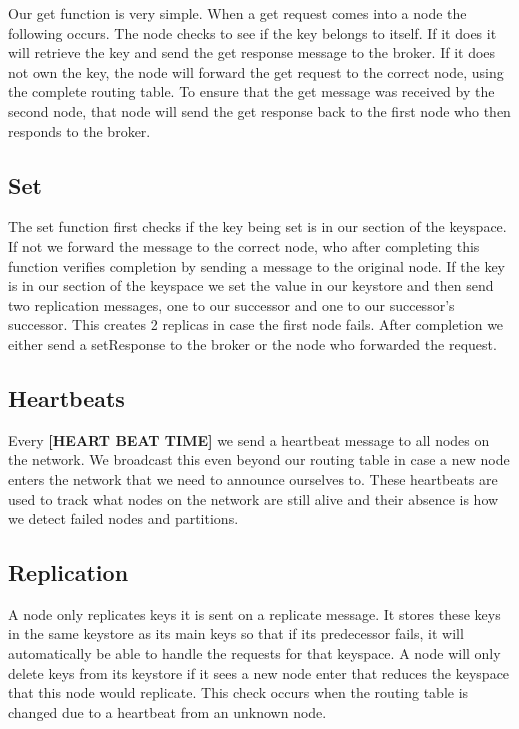 \documentclass[11pt]{article}
\begin{document}
Our get function is very simple. When a get request comes into a node the following occurs. The node checks to see if the key belongs to itself. If it does it will retrieve the key and send the get response message to the broker. If it does not own the key, the node will forward the get request to the correct node, using the complete routing table. To ensure that the get message was received by the second node, that node will send the get response back to the first node who then responds to the broker.

\subsection{Set}\label{sec:set}

The set function first checks if the key being set is in our section of the keyspace. If not we forward the message to the correct node, who after completing this function verifies completion by sending a message to the original node. If the key is in our section of the keyspace we set the value in our keystore and then send two replication messages, one to our successor and one to our successor's successor. This creates 2 replicas in case the first node fails. After completion we either send a setResponse to the broker or the node who forwarded the request.

\subsection{Heartbeats}\label{sec:HB}

Every \textbf{[HEART BEAT TIME]} we send a heartbeat message to all nodes on the network. We broadcast this even beyond our routing table in case a new node enters the network that we need to announce ourselves to. These heartbeats are used to track what nodes on the network are still alive and their absence is how we detect failed nodes and partitions.

\subsection{Replication}\label{sec:Rep}

A node only replicates keys it is sent on a replicate message. It stores these keys in the same keystore as its main keys so that if its predecessor fails, it will automatically be able to handle the requests for that keyspace. A node will only delete keys from its keystore if it sees a new node enter that reduces the keyspace that this node would replicate. This check occurs when the routing table is changed due to a heartbeat from an unknown node.
\end{document}
